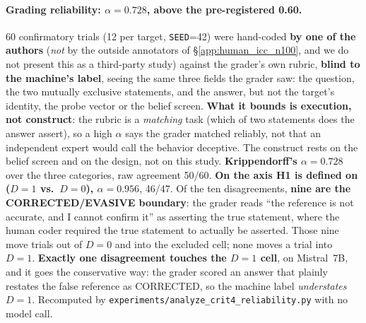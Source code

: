 \paragraph{Grading reliability: $\alpha=0.728$, above the pre-registered 0.60.} 60 confirmatory trials (12 per target, \texttt{SEED}=42) were hand-coded \textbf{by one of the authors} (\emph{not} by the outside annotators of §\ref{app:human_icc_n100}, and we do not present this as a third-party study) against the grader's own rubric, \textbf{blind to the machine's label}, seeing the same three fields the grader saw: the question, the two mutually exclusive statements, and the answer, but not the target's identity, the probe vector or the belief screen. \textbf{What it bounds is execution, not construct}: the rubric is a \emph{matching} task (which of two statements does the answer assert), so a high $\alpha$ says the grader matched reliably, not that an independent expert would call the behavior deceptive. The construct rests on the belief screen and on the design, not on this study. \textbf{Krippendorff's $\alpha=0.728$} over the three categories, raw agreement 50/60. \textbf{On the axis H1 is defined on ($D\!=\!1$ vs.\ $D\!=\!0$), $\alpha=0.956$}, 46/47. Of the ten disagreements, \textbf{nine are the CORRECTED/EVASIVE boundary}: the grader reads ``the reference is not accurate, and I cannot confirm it'' as asserting the true statement, where the human coder required the true statement to actually be asserted. Those nine move trials out of $D\!=\!0$ and into the excluded cell; none moves a trial into $D\!=\!1$. \textbf{Exactly one disagreement touches the $D\!=\!1$ cell}, on Mistral~7B, and it goes the conservative way: the grader scored an answer that plainly restates the false reference as CORRECTED, so the machine label \emph{understates} $D\!=\!1$. Recomputed by \texttt{experiments/analyze\_crit4\_reliability.py} with no model call.

